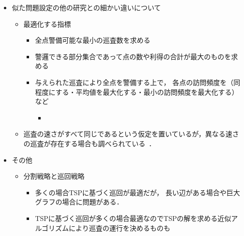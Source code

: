 \begin{itemize}
  \item 似た問題設定の他の研究との細かい違いについて
  \begin{itemize}
    \item 最適化する指標
    \begin{itemize}
      \item 全点警備可能な最小の巡査数を求める
      \item 警邏できる部分集合であって点の数や利得の合計が最大のものを求める
      \item 与えられた巡査により全点を警備する上で，
      各点の訪問頻度を（同程度にする・平均値を最大化する・最小の訪問頻度を最大化する）など
      \begin{itemize}
        \item 
      \end{itemize}
    \end{itemize}
    \item 巡査の速さがすべて同じであるという仮定を置いているが，異なる速さの巡査が存在する場合も調べられている~\cite{}．
  \end{itemize}

  \item その他
  \begin{itemize}
    \item 分割戦略と巡回戦略
    \begin{itemize}
      \item 多くの場合TSPに基づく巡回が最適だが，
      長い辺がある場合や巨大グラフの場合に問題がある．
      \item TSPに基づく巡回が多くの場合最適なのでTSPの解を求める近似アルゴリズムにより巡査の運行を決めるものも
    \end{itemize} 
  \end{itemize}
\end{itemize}



